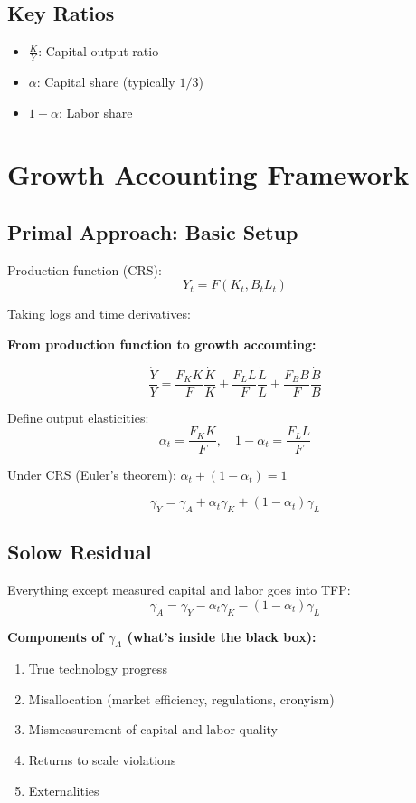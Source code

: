 \documentclass[a4paper,11pt]{article}
\newcommand{\gammay}{\gamma_Y}
\newcommand{\gammaA}{\gamma_A}
\newcommand\gammaK{\gamma_K}
\newcommand\gammaL{\gamma_L}
\newcommand{\ky}{\frac{K}{Y}}
\begin{document}
\subsection*{Key Ratios}
\begin{itemize}
    \item $\ky$: Capital-output ratio
    \item $\alpha$: Capital share (typically $1/3$)
    \item $1-\alpha$: Labor share
\end{itemize}

\section{Growth Accounting Framework}

\subsection*{Primal Approach: Basic Setup}

Production function (CRS):
\[
Y_t = F(K_t, B_t L_t)
\]

Taking logs and time derivatives:
\begin{derivationbox}
\textbf{From production function to growth accounting:}

\[
\frac{\dot{Y}}{Y} = \frac{F_K K}{F}\frac{\dot{K}}{K} + \frac{F_L L}{F}\frac{\dot{L}}{L} + \frac{F_B B}{F}\frac{\dot{B}}{B}
\]

Define output elasticities:
\[
\alpha_t = \frac{F_K K}{F}, \quad 1-\alpha_t = \frac{F_L L}{F}
\]

Under CRS (Euler's theorem): $\alpha_t + (1-\alpha_t) = 1$

\[
\boxed{\gammay = \gammaA + \alpha_t \gammaK + (1-\alpha_t)\gammaL}
\tag{Growth-Accounting}
\]
\end{derivationbox}

\subsection*{Solow Residual}

Everything except measured capital and labor goes into TFP:
\[
\boxed{\gammaA = \gammay - \alpha_t \gammaK - (1-\alpha_t)\gammaL}
\tag{Solow-Residual}
\]

\begin{resultbox}
\textbf{Components of $\gamma_A$ (what's inside the black box):}
\begin{enumerate}
    \item True technology progress
    \item Misallocation (market efficiency, regulations, cronyism)
    \item Mismeasurement of capital and labor quality
    \item Returns to scale violations
    \item Externalities
\end{enumerate}
\end{resultbox}
\end{document}
